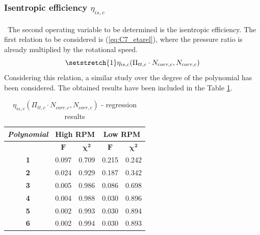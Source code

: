 \subsubsection{Isentropic efficiency $\eta_{is,c}$}
\quad\ The second operating variable to be determined is the isentropic efficiency. The first relation to be considered is (\ref{eq:C7_etarel}), where the pressure ratio is already multiplied by the rotational speed.
\begin{equation}
    \setstretch{1}
    \eta_{is,c}(\Pi_{tt,c}\cdot N_{corr,c},N_{corr,c}) \label{eq:C7_etarel}
\end{equation}
Considering this relation, a similar study over the degree of the polynomial has been considered. The obtained results have been included in the Table \ref{tab:C7_regcomp3}.

\begin{longtable}[c]{@{}ccc|cc@{}}
\caption{$\eta_{is,c}(\Pi_{tt,c}\cdot N_{corr,c},N_{corr,c})$ - regression results}
\label{tab:C7_regcomp3}\\
\toprule
\textit{\textbf{Polynomial}} & \multicolumn{2}{c|}{High RPM}                        & \multicolumn{2}{c}{Low RPM}    \\* \midrule
\endfirsthead
%
\endhead
%
\bottomrule
\endfoot
%
\endlastfoot
%
\multicolumn{1}{c}{\textbf{Degree}}              & \multicolumn{1}{c}{$\mathbf{F}$} & \multicolumn{1}{c|}{$\mathbf{\chi^2}$} & \multicolumn{1}{c}{$\mathbf{F}$} & \multicolumn{1}{c}{$\mathbf{\chi^2}$} \\
\multicolumn{1}{c}{\textbf{1}}                   & 0.097      & 0.709             & 0.215      & 0.242             \\
\multicolumn{1}{c}{\textbf{2}}                   & 0.024      & 0.929             & 0.187      & 0.342             \\
\multicolumn{1}{c}{\textbf{3}}                   & 0.005      & 0.986             & 0.086      & 0.698             \\
\multicolumn{1}{c}{\textbf{4}}                   & 0.004      & 0.988            & 0.030      & 0.896             \\
\multicolumn{1}{c}{\textbf{5}}                   & 0.002      & 0.993           & 0.030      & 0.894             \\
\multicolumn{1}{c}{\textbf{6}}                   & 0.002      & 0.994                                  & 0.030      & 0.893             \\* \bottomrule
\end{longtable}

